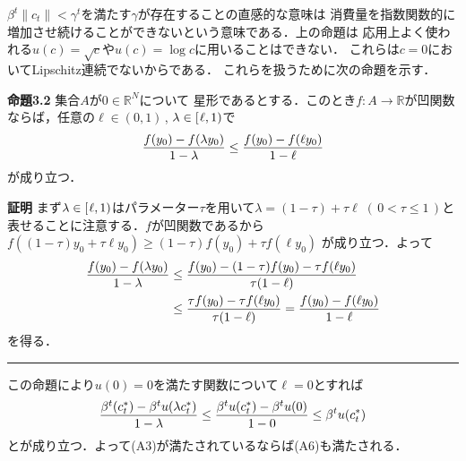 \documentclass[a4paper,11pt]{jsarticle}
\DeclareRobustCommand{\lfrac}[2]{{\lower.4ex\hbox{\begingroup\ensuremath{#1}\endgroup}\over{\hspace{.2mm}#2\hspace{.2mm}}}}
\begin{document}
\vspace{7mm}

$\beta^t \|c_t\|<\gamma^t$を満たす$\gamma$が存在することの直感的な意味は
消費量を指数関数的に増加させ続けることができないという意味である．上の命題は
応用上よく使われる$u(c)=\sqrt{c}$や$u(c)=\log c$に用いることはできない．
これらは$c=0$においてLipschitz連続でないからである．
これらを扱うために次の命題を示す．


\vspace{7mm}
\noindent \textbf{命題3.2}\hspace*{.7mm} 集合$A$が$0\in \mathbb{R}^N$について
星形であるとする．このとき$f:A\to \mathbb{R}$が凹関数ならば，任意の$\ell \in (0,1)$\,, $\lambda \in [\hspace{.3mm} \ell,1)$で
\begin{align*}
	\lfrac{f(y_0)-f(\lambda y_0)}{1-\lambda}\leq \lfrac{f(y_0)-f(\ell y_0)}{1-\ell}
\end{align*}
が成り立つ．
\bigskip

\noindent \textbf{証明}\hspace{.7mm} まず$\lambda \in [\hspace{.3mm}\ell,1)$はパラメーター$\tau$を用いて$\lambda=(1-\tau)+\tau \ell \; (\,0< \tau \leq 1\,)$と表せることに注意する．$f$が凹関数であるから$f((1-\tau)y_0+\tau \ell y_0)\geq (1-\tau)f(y_0)+\tau f(\ell y_0)$
が成り立つ．よって
\jot=7pt
\begin{align*}
	\lfrac{f(y_0)-f(\lambda y_0)}{1-\lambda}
	&\leq \lfrac{f(y_0)-(1-\tau)f(y_0)-\tau f(\ell y_0)}{\tau(1-\ell)}\\
	&\leq \lfrac{\tau f(y_0)-\tau f(\ell y_0)}{\tau(1-\ell)}=\lfrac{f(y_0)-f(\ell y_0)}{1-\ell}
\end{align*}
\jot=3pt
を得る．\hfill \rule[-2pt]{5pt}{10pt}

\vspace{7mm}

この命題により$u(0)=0$を満たす関数について$\ell=0$とすれば
\begin{align*}
	\lfrac{\beta^t (c_t^*)-\beta^t u(\lambda c_t^*)}{1-\lambda}\leq \lfrac{\beta^tu(c_t^*)-\beta^t u(0)}{1-0}\leq \beta^t u(c_t^*)
\end{align*}
とが成り立つ．よって(A3)が満たされているならば(A6)も満たされる．
\end{document}
